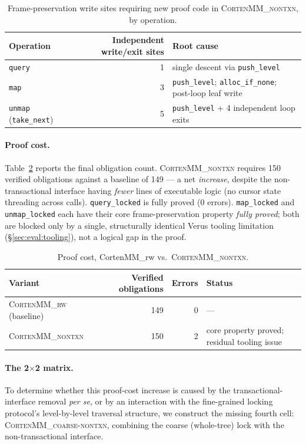 \documentclass[10pt]{article}
\newcommand{\corten}[1]{\textsc{CortenMM\_#1}}
\begin{document}
\begin{table}[h]
\centering
\caption{Frame-preservation write sites requiring new proof code in
\corten{nontxn}, by operation.}
\label{tab:gap4-sites}
\begin{tabular}{@{}lrl@{}}
\toprule
Operation & Independent write/exit sites & Root cause \\
\midrule
\texttt{query}      & 1 & single descent via \texttt{push\_level} \\
\texttt{map}         & 3 & \texttt{push\_level}; \texttt{alloc\_if\_none}; post-loop leaf write \\
\texttt{unmap} (\texttt{take\_next}) & 5 & \texttt{push\_level} + 4 independent loop exits \\
\bottomrule
\end{tabular}
\end{table}

\paragraph{Proof cost.} Table~\ref{tab:gap4-proof} reports the final
obligation count. \corten{nontxn} requires 150 verified obligations
against a baseline of 149 --- a net \emph{increase}, despite the
non-transactional interface having \emph{fewer} lines of executable
logic (no cursor state threading across calls). \texttt{query\_locked}
is fully proved (0 errors). \texttt{map\_locked} and
\texttt{unmap\_locked} each have their core frame-preservation property
\emph{fully proved}; both are blocked only by a single, structurally
identical Verus tooling limitation (\S\ref{sec:eval:tooling}), not a
logical gap in the proof.

\begin{table}[h]
\centering
\caption{Proof cost, CortenMM\_rw vs.\ \corten{nontxn}.}
\label{tab:gap4-proof}
\begin{tabular}{@{}lrrl@{}}
\toprule
Variant & Verified obligations & Errors & Status \\
\midrule
\corten{rw} (baseline) & 149 & 0 & --- \\
\corten{nontxn}        & 150 & 2 & core property proved; residual tooling issue \\
\bottomrule
\end{tabular}
\end{table}

\paragraph{The 2$\times$2 matrix.} To determine whether this proof-cost
increase is caused by the transactional-interface removal \emph{per se},
or by an interaction with the fine-grained locking protocol's
level-by-level traversal structure, we construct the missing fourth
cell: \corten{coarse-nontxn}, combining the coarse (whole-tree) lock
with the non-transactional interface.
\end{document}
